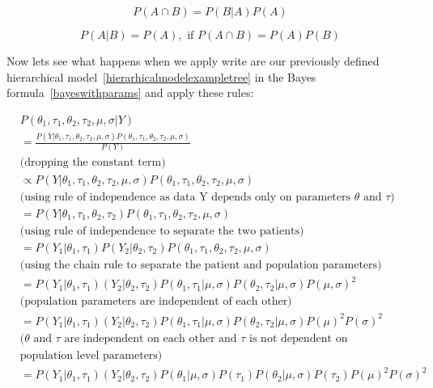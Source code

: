 \documentclass[12pt,a4paper,leqno]{report}
\theoremstyle{plain}
\theoremstyle{definition}
\theoremstyle{remark}
\begin{document}
\begin{equation}\label{chainrule}
    P(A \cap B) = P(B|A)P(A)
\end{equation}

\begin{equation}\label{ruleofindependence}
    P(A|B) = P(A), \text{ if } P(A \cap B) = P(A)P(B)
\end{equation}
\smallskip

Now lets see what happens when we apply write are our previously defined hierarchical
model\ \ref{hierarhicalmodelexampletree} in the Bayes formula\
\ref{bayeswithparams} and apply these rules:

\begin{equation*}\label{}
    \begin{aligned}\label{conjugatebayesrule}
        &P(\theta_1,\tau_1,\theta_2,\tau_2,\mu,\sigma | Y) \\
        &= \frac{P(Y | \theta_1,\tau_1,\theta_2,\tau_2,\mu,\sigma)P(\theta_1,\tau_1,\theta_2,\tau_2,\mu,\sigma)}{P(Y)} \\
        &\text{(dropping the constant term)} \\
        &\propto P(Y | \theta_1,\tau_1,\theta_2,\tau_2,\mu,\sigma)P(\theta_1,\tau_1,\theta_2,\tau_2,\mu,\sigma) \\
        &\text{(using rule of independence as data Y depends only on parameters $\theta$ and $\tau$)} \\
        &= P(Y | \theta_1,\tau_1,\theta_2,\tau_2)P(\theta_1,\tau_1,\theta_2,\tau_2,\mu,\sigma) \\
        &\text{(using rule of independence to separate the two patients)} \\
        &= P(Y_1 | \theta_1,\tau_1)P(Y_2 | \theta_2,\tau_2)P(\theta_1,\tau_1,\theta_2,\tau_2,\mu,\sigma) \\
        &\text{(using the chain rule to separate the patient and population parameters)} \\
        &= P(Y_1|\theta_1,\tau_1)(Y_2|\theta_2, \tau_2)P(\theta_1,\tau_1|\mu,\sigma)P(\theta_2,\tau_2|\mu,\sigma)P(\mu, \sigma)^2 \\
        &\text{(population parameters are independent of each other)} \nonumber \\
        &= P(Y_1|\theta_1,\tau_1)(Y_2|\theta_2, \tau_2)P(\theta_1,\tau_1|\mu,\sigma)P(\theta_2,\tau_2|\mu,\sigma)P(\mu)^2P(\sigma)^2 \\
        &\text{($\theta$ and $\tau$ are independent on each other and $\tau$ is not dependent on} \\
        & \text{population level parameters)} \\
        &= P(Y_1|\theta_1,\tau_1)(Y_2|\theta_2, \tau_2)P(\theta_1|\mu,\sigma)P(\tau_1)P(\theta_2|\mu,\sigma)P(\tau_2)P(\mu)^2P(\sigma)^2 \nonumber
    \end{aligned}
\end{equation*}
\end{document}
